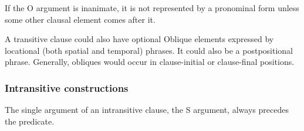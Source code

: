 \documentclass[output=paper]{langsci/langscibook}
\begin{document}
If the O argument is inanimate, it is not represented by a pronominal form unless some other clausal element comes after it.

\ea
\label{ex:15.osam}
	\z

	\z

	\z
\z

A transitive clause could also have optional Oblique elements expressed by locational (both spatial and temporal) phrases. It could also be a postpositional phrase. Generally, obliques would occur in clause-initial or clause-final positions. 


\ea
\label{ex:16.osam}
	\z

	\z
\z

\subsubsection{Intransitive constructions}\label{§2.3.2:intransitive.osam}

The single argument of an intransitive clause, the S argument, always precedes the predicate. 

\ea
\label{ex:17.osam}
	\z
\end{document}
